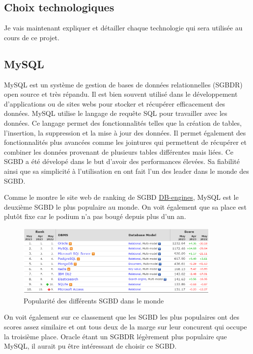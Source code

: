 \subsection{Choix technologiques}
Je vais maintenant expliquer et détailler chaque technologie qui sera utilisée au cours de ce projet.

\subsection{MySQL}
MySQL est un système de gestion de bases de données relationnelles (SGBDR) open source et très répandu. Il est bien souvent utilisé dans le développement d'applications ou de sites webs pour stocker et récupérer efficacement des données. MySQL utilise le langage de requête SQL pour travailler avec les données. Ce langage permet des fonctionnalités telles que la création de tables, l'insertion, la suppression et la mise à jour des données. Il permet également des fonctionnalités plus avancées comme les jointures qui permettent de récupérer et combiner les données provenant de plusieurs tables différentes mais liées. Ce SGBD a été dévelopé dans le but d'avoir des performances élevées. Sa fiabilité ainsi que sa simplicité à l'utilisation en ont fait l'un des leader dans le monde des SGBD.

Comme le montre le site web de ranking de SGBD \href{https://db-engines.com/en/ranking}{DB-engines}, MySQL est le deuxième SGBD le plus populaire au monde. On voit également que sa place est plutôt fixe car le podium n'a pas bougé depuis plus d'un an.
\begin{center} %
    \begin{figure}[H]
        \includegraphics[width=10cm]{./assets/figures/MySQLPopularity.png}
        \caption{Popularité des différents SGBD dans le monde \label{MySQLPopularity.png}}
    \end{figure}
\end{center}
On voit également sur ce classement que les SGBD les plus populaires ont des scores assez similaire et ont tous deux de la marge sur leur concurent qui occupe la troisième place. Oracle étant un SGBDR légèrement plus populaire que MySQL, il aurait pu être intéressant de choisir ce SGBD.

